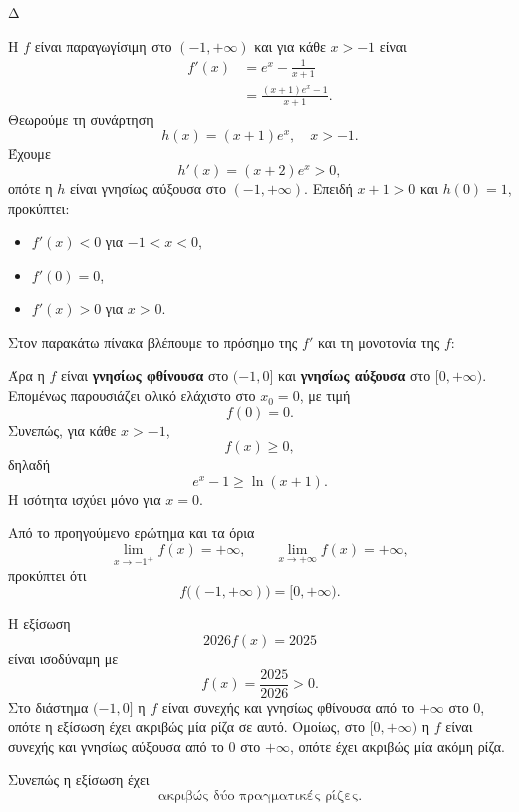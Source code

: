 \begin{thema}{Δ}
\begin{erwthma}
\item Η $f$ είναι παραγωγίσιμη στο $(-1,+\infty)$ και για κάθε $x>-1$ είναι
\begin{align*}
f'(x)
&=e^x-\frac{1}{x+1}\\
&=\frac{(x+1)e^x-1}{x+1}.
\end{align*}
Θεωρούμε τη συνάρτηση
\[
h(x)=(x+1)e^x,\quad x>-1.
\]
Έχουμε
\[
h'(x)=(x+2)e^x>0,
\]
οπότε η $h$ είναι γνησίως αύξουσα στο $(-1,+\infty)$. Επειδή $x+1>0$ και $h(0)=1$, προκύπτει:
\begin{itemize}
\item $f'(x)<0$ για $-1<x<0$,
\item $f'(0)=0$,
\item $f'(x)>0$ για $x>0$.
\end{itemize}
Στον παρακάτω πίνακα βλέπουμε το πρόσημο της $f'$ και τη μονοτονία της $f$:
\begin{center}
\end{center}

Άρα η $f$ είναι \textbf{γνησίως φθίνουσα} στο $(-1,0]$ και \textbf{γνησίως αύξουσα} στο $[0,+\infty)$. Επομένως παρουσιάζει ολικό ελάχιστο στο $x_0=0$, με τιμή
\[
{f(0)=0}.
\]
Συνεπώς, για κάθε $x>-1$,
\[
f(x)\geq0,
\]
δηλαδή
\[
{e^x-1\geq\ln(x+1)}.
\]
Η ισότητα ισχύει μόνο για $x=0$.

\item Από το προηγούμενο ερώτημα και τα όρια
\[
\lim_{x\to-1^+}f(x)=+\infty,
\qquad
\lim_{x\to+\infty}f(x)=+\infty,
\]
προκύπτει ότι
\[
{f\big((-1,+\infty)\big)=[0,+\infty)}.
\]

Η εξίσωση
\[
2026f(x)=2025
\]
είναι ισοδύναμη με
\[
f(x)=\frac{2025}{2026}>0.
\]
Στο διάστημα $(-1,0]$ η $f$ είναι συνεχής και γνησίως φθίνουσα από το $+\infty$ στο $0$, οπότε η εξίσωση έχει ακριβώς μία ρίζα σε αυτό. Ομοίως, στο $[0,+\infty)$ η $f$ είναι συνεχής και γνησίως αύξουσα από το $0$ στο $+\infty$, οπότε έχει ακριβώς μία ακόμη ρίζα.

Συνεπώς η εξίσωση έχει
\[
{\text{ακριβώς δύο πραγματικές ρίζες}}.
\]


\end{erwthma}
\end{thema}
